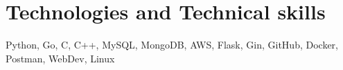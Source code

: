 \documentclass[letterpaper,11pt]{article}
\newcommand{\resumeSubHeadingListStart}{\begin{itemize}[leftmargin=0.0in, label={}]}
\newcommand{\resumeSubHeadingListEnd}{\end{itemize}}
\begin{document}
\section{Technologies and Technical skills }%
 \begin{itemize}[leftmargin=0in, label={}]
    \small{\item{
     \textnormal{Python, Go, C, C++, MySQL, MongoDB, AWS, Flask, Gin, GitHub, Docker, Postman, WebDev, Linux } \\
    }}
 \end{itemize}
 \vspace{-16pt}
\end{document}
